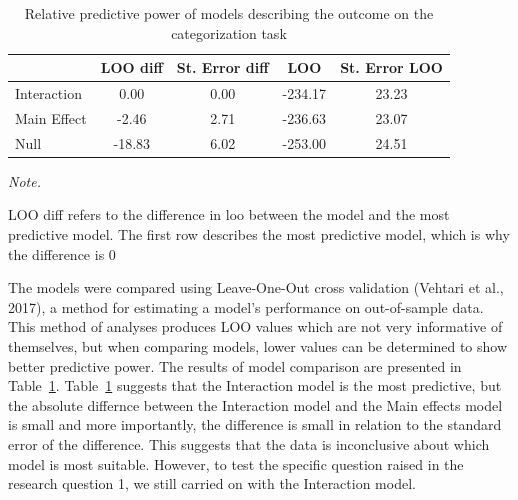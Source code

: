 \documentclass[
  man]{apa7}
\begin{document}
\begin{table}

\caption{\label{tab:loo}Relative predictive power of models describing the outcome on the categorization task}
\centering
\begin{threeparttable}
\begin{tabular}[t]{lcccc}
\toprule
  & LOO diff & St. Error diff & LOO & St. Error LOO\\
\midrule
Interaction & 0.00 & 0.00 & -234.17 & 23.23\\
Main Effect & -2.46 & 2.71 & -236.63 & 23.07\\
Null & -18.83 & 6.02 & -253.00 & 24.51\\
\bottomrule
\end{tabular}
\begin{tablenotes}[para]
\item \textit{Note.} 
\item LOO diff refers to the difference in loo between the model and the most predictive model. The first row describes the most predictive model, which is why the difference is 0
\end{tablenotes}
\end{threeparttable}
\end{table}

The models were compared using Leave-One-Out cross validation (Vehtari et al., 2017), a method for estimating a model's performance on out-of-sample data. This method of analyses produces LOO values which are not very informative of themselves, but when comparing models, lower values can be determined to show better predictive power. The results of model comparison are presented in Table~\ref{tab:loo}.
Table~\ref{tab:loo} suggests that the Interaction model is the most predictive, but the absolute differnce between the Interaction model and the Main effects model is small and more importantly, the difference is small in relation to the standard error of the difference. This suggests that the data is inconclusive about which model is most suitable. However, to test the specific question raised in the research question 1, we still carried on with the Interaction model.
\end{document}
